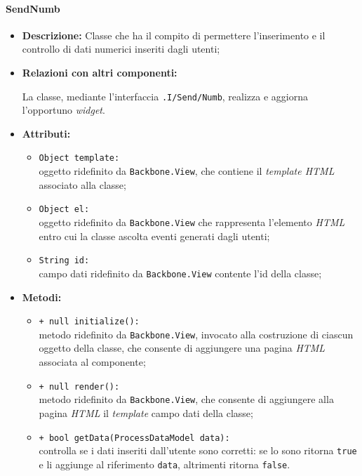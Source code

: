 \paragraph{SendNumb}
\label{sendNumb}
\begin{flushleft}
\begin{itemize}
\item \textbf{Descrizione:} Classe che ha il compito di permettere l'inserimento e il controllo di dati numerici inseriti dagli utenti;
\item \textbf{Relazioni con altri componenti:}
\begin{sloppypar}
La classe, mediante l'interfaccia \texttt{\viewUser{}.I\fshyp{}Send\fshyp{}Numb}, realizza e aggiorna l'opportuno \textit{widget}.
\end{sloppypar}
\item \textbf{Attributi:}
\begin{sloppypar}
\begin{itemize}
\item \texttt{Object template:}\\ oggetto ridefinito da \texttt{Backbone.View}, che contiene il \textit{template HTML} associato alla classe;
\item \texttt{Object el:}\\ oggetto ridefinito da \texttt{Backbone.View} che rappresenta l'elemento \textit{HTML} entro cui la classe ascolta eventi generati dagli utenti;
\item \texttt{String id:}\\ campo dati ridefinito da \texttt{Backbone.View} contente l'id della classe;
\end{itemize}
\end{sloppypar}
\item \textbf{Metodi:}
\begin{sloppypar}
\begin{itemize}
\item \texttt{+ null initialize():}\\ metodo ridefinito da \texttt{Backbone.View}, invocato alla costruzione di ciascun oggetto della classe, che consente di aggiungere una pagina \textit{HTML} associata al componente;
\item \texttt{+ null render():}\\ metodo ridefinito da \texttt{Backbone.View}, che consente di aggiungere alla pagina \textit{HTML} il \textit{template} campo dati della classe;
\item \texttt{+ bool getData(ProcessDataModel data):}\\ controlla se i dati inseriti dall'utente sono corretti: se lo sono ritorna \texttt{true} e li aggiunge al riferimento \texttt{data}, altrimenti ritorna \texttt{false}.
\end{itemize}
\end{sloppypar}
\end{itemize}
\end{flushleft}

